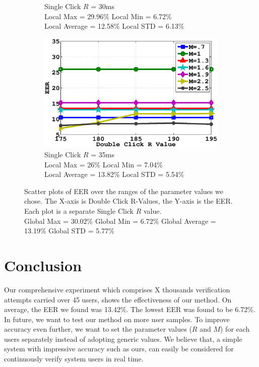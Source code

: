 \documentclass[conference]{IEEEtran}
\begin{document}
\begin{figure}[p]
\begin{subfigure}{.5\textwidth}
  \caption{Single Click $R$ = 30ms \\Local Max = 29.96\% Local Min = 6.72\% \\Local Average = 12.58\% Local STD = 6.13\%}
  \label{fig:sfig3}
\end{subfigure}%
\begin{subfigure}{.5\textwidth}
  \centering
  \includegraphics[width=.8\linewidth]{35.eps}
  \caption{Single Click $R$ = 35ms \\Local Max = 26\% Local Min = 7.04\%\\Local Average = 13.82\% Local STD = 5.54\%}
  \label{fig:sfig4}
\end{subfigure}
\caption{Scatter plots of EER over the ranges of the parameter values we chose. The X-axis is Double Click R-Values, the Y-axis is the EER. Each plot is a separate Single Click $R$ value. \\Global Max = 30.02\% Global Min = 6.72\% Global Average = 13.19\% Global STD = 5.77\%}
\label{fig:fig}
\end{figure}


\section{Conclusion}

Our comprehensive experiment which comprises X thousands verification attempts carried over 45 users, shows the effectiveness of our method. On average, the EER we found was 13.42\%. The lowest EER was found to be 6.72\%. In future, we want to test our method on more user samples. To improve accuracy even further, we want to set the parameter values ($R$ and $M$) for each users separately instead of adopting generic values. We believe that, a simple system with impressive accuracy such as ours, can easily be considered for continuously verify system users in real time.    
\end{document}
